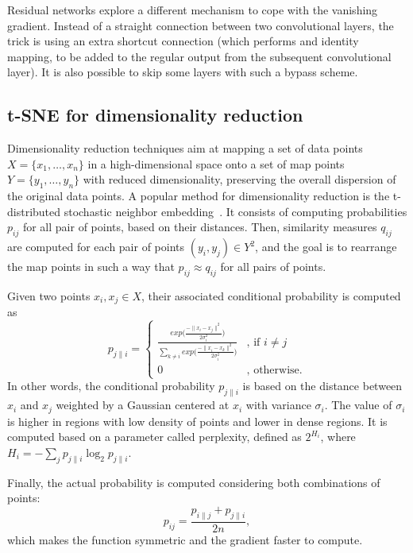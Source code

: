 \documentclass[sn-basic]{sn-jnl}%
\theoremstyle{thmstyleone}%
\theoremstyle{thmstyletwo}%
\theoremstyle{thmstylethree}%
\begin{document}
Residual networks explore a different mechanism to cope with the vanishing gradient. Instead of a straight connection between two convolutional layers, the trick is using an extra shortcut connection (which performs and identity mapping, to be added to the regular output from the subsequent convolutional layer). It is also possible to skip some layers with such a bypass scheme.


\subsection{t-SNE for dimensionality reduction}

Dimensionality reduction techniques aim at mapping a set of data points $X = \{x_1, \ldots, x_n\}$ in a high-dimensional space onto a set of map points $Y = \{y_1, \ldots, y_n\}$ with reduced dimensionality, preserving the overall dispersion of the original data points. A popular method for dimensionality reduction is the t-distributed stochastic neighbor embedding~\citep{tsne-paper}. It consists of computing probabilities $p_{ij}$ for all pair of points, based on their distances. Then, similarity measures $q_{ij}$ are computed for each pair of points $(y_i, y_j) \in Y^2$, and the goal is to rearrange the map points in such a way that $p_{ij} \approx q_{ij}$ for all pairs of points.

Given two points $x_i, x_j \in X$, their associated conditional probability is computed as
\begin{equation}
\label{eq:p_ji_sne}
	p_{j\|i} =
	\begin{cases}
	\frac{exp \big(\frac{-\| x_i - x_j\|^2}{2\sigma_i^2}\big)}
	{\sum\limits_{k \neq i} exp \big(\frac{-\| x_i - x_k\|^2}{2\sigma_i^2}\big)} & \text{, if } i \neq j\\
	0 & \text{, otherwise.}
	\end{cases}
\end{equation}
In other words, the conditional probability $p_{j\|i}$ is based on the distance between $x_i$ and $x_j$ weighted by a Gaussian centered at $x_i$ with variance $\sigma_i$. The value of $\sigma_i$ is higher in regions with low density of points and lower in dense regions. It is computed based on a parameter called perplexity, defined as $2^{H_i}$, where $H_i = -\sum\limits_j p_{j\|i} \log_2 p_{j\|i}$.

Finally, the actual probability is computed considering both combinations of points:
\begin{equation}
	\label{eq:p_ij_tsne}	
	p_{ij} = \frac{p_{i\|j} + p_{j\|i}}{2n},
\end{equation}
which makes the function symmetric and the gradient faster to compute.
\end{document}
